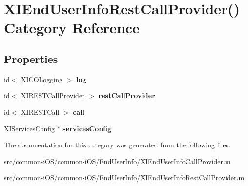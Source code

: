\hypertarget{category_x_i_end_user_info_rest_call_provider_07_08}{}\section{X\+I\+End\+User\+Info\+Rest\+Call\+Provider() Category Reference}
\label{category_x_i_end_user_info_rest_call_provider_07_08}
\subsection*{Properties}
\begin{DoxyCompactItemize}
\item 
\hypertarget{category_x_i_end_user_info_rest_call_provider_07_08_a3e16c93dfeb6a78abc96094b8db42a0b}{}\label{category_x_i_end_user_info_rest_call_provider_07_08_a3e16c93dfeb6a78abc96094b8db42a0b} 
id$<$ \hyperlink{protocol_x_i_c_o_logging-p}{X\+I\+C\+O\+Logging} $>$ {\bfseries log}
\item 
\hypertarget{category_x_i_end_user_info_rest_call_provider_07_08_a7c452377b8623601f7b31ad598b4a963}{}\label{category_x_i_end_user_info_rest_call_provider_07_08_a7c452377b8623601f7b31ad598b4a963} 
id$<$ X\+I\+R\+E\+S\+T\+Call\+Provider $>$ {\bfseries rest\+Call\+Provider}
\item 
\hypertarget{category_x_i_end_user_info_rest_call_provider_07_08_a9b74b11d8bd84edef687ea17499639b4}{}\label{category_x_i_end_user_info_rest_call_provider_07_08_a9b74b11d8bd84edef687ea17499639b4} 
id$<$ X\+I\+R\+E\+S\+T\+Call $>$ {\bfseries call}
\item 
\hypertarget{category_x_i_end_user_info_rest_call_provider_07_08_a746df25a34b6d5b00ba5f20074f8e31e}{}\label{category_x_i_end_user_info_rest_call_provider_07_08_a746df25a34b6d5b00ba5f20074f8e31e} 
\hyperlink{interface_x_i_services_config}{X\+I\+Services\+Config} $\ast$ {\bfseries services\+Config}
\end{DoxyCompactItemize}


The documentation for this category was generated from the following files\+:\begin{DoxyCompactItemize}
\item 
src/common-\/i\+O\+S/common-\/i\+O\+S/\+End\+User\+Info/X\+I\+End\+User\+Info\+Call\+Provider.\+m\item 
src/common-\/i\+O\+S/common-\/i\+O\+S/\+End\+User\+Info/X\+I\+End\+User\+Info\+Rest\+Call\+Provider.\+m\end{DoxyCompactItemize}
